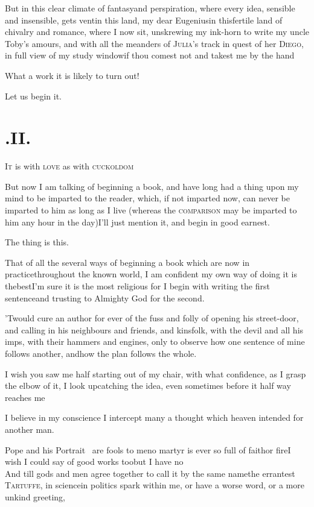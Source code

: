 \documentclass{article}
\begin{document}
But in this clear climate of fantasy\break and perspiration, where
every idea,\pb
sensible and insensible, gets vent\tsk in this land,
my dear Eugenius\tsk in this\break fertile land of chivalry and
romance, where I now sit, unskrewing my ink-horn to write my uncle
Toby’s amours, and with all the meanders of
\textsc{Julia}’s track in quest of her
\textsc{Diego}, in full view of my study window\tsk if thou
comest not and takest me by the hand\tsh

What a work it is likely to turn out!

Let us begin it.




\newpage
\section{.\enspace II.}

\lettrine{I}{t} is with \textsc{love} as
with \textsc{cuck}\textsc{oldom}\tsh

\bigskip
\tsh But now I am talking of beginning a book, and have long had a
thing upon my mind to be imparted to the reader, which, if not
imparted now, can never be imparted to him as long as I live
(whereas the \textsc{comparison} may be imparted to him any
hour in the day)\tsh I’ll just mention it, and begin
in good earnest.

The thing is this.

That of all the several ways of beginning a book which are now
in practice\pb throughout the known world, I am confident my own way
of doing it is the\break best\tsh I’m sure it is the most
religious \hbox{}\tsh for I begin with writing the first
sentence\tsh and trusting to Almighty God for the
second.

’Twould cure an author for ever of\break
the fuss and folly of opening his street-door,
and calling in his neighbours and friends, and kinsfolk, with the devil and all his
imps, with their hammers and engines, \etc only to observe how one sentence of mine
follows another, and\break how the plan follows the whole.

I wish you saw me half starting out of my chair, with what confidence, as I grasp
the elbow of it, I look up\tsh\pb catching the idea, even sometimes before it half way
reaches me\tsh

I believe in my conscience I intercept many a thought which
heaven intended for another man.


Pope and his Portrait \fnast\  are fools to\break
me\tsh no martyr is ever so full of faith\break or
fire\tsh I wish I could say of good works too\tsh but I have
no\\
\break
And till gods and men agree together to call it by the same
name\tsh the errantest \textsc{Tartuffe}, in science\tsk in
politics\break
{}
spark within
me, or have a worse word, or a more unkind greeting,\break
\stick{\hfill}\break
{}
\end{document}
